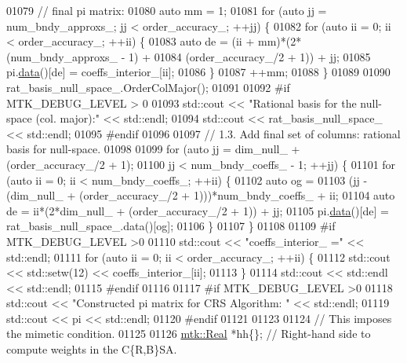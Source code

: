 \begin{DoxyCode}
{{01079   \textcolor{comment}{// final pi matrix:}
01080   \textcolor{keyword}{auto} mm = 1;
01081   \textcolor{keywordflow}{for} (\textcolor{keyword}{auto} jj = num\_bndy\_approxs\_; jj < order\_accuracy\_; ++jj) \{
01082     \textcolor{keywordflow}{for} (\textcolor{keyword}{auto} ii = 0; ii < order\_accuracy\_; ++ii) \{
01083       \textcolor{keyword}{auto} de = (ii + mm)*(2*(num\_bndy\_approxs\_ - 1) +
01084         (order\_accuracy\_/2 + 1)) + jj;
01085       pi.\hyperlink{classmtk_1_1DenseMatrix_a16b3ff56feb2658b9fc7147d1de4d8e7}{data}()[de] = coeffs\_interior\_[ii];
01086     \}
01087     ++mm;
01088   \}
01089 
01090   rat\_basis\_null\_space\_.OrderColMajor();
01091 
01092 \textcolor{preprocessor}{  #if MTK\_DEBUG\_LEVEL > 0}
01093   std::cout << \textcolor{stringliteral}{"Rational basis for the null-space (col. major):"} << std::endl;
01094   std::cout << rat\_basis\_null\_space\_ << std::endl;
01095 \textcolor{preprocessor}{  #endif}
01096 
01097   \textcolor{comment}{// 1.3. Add final set of columns: rational basis for null-space.}
01098 
01099   \textcolor{keywordflow}{for} (\textcolor{keyword}{auto} jj = dim\_null\_ + (order\_accuracy\_/2 + 1);
01100        jj < num\_bndy\_coeffs\_ - 1; ++jj) \{
01101     \textcolor{keywordflow}{for} (\textcolor{keyword}{auto} ii = 0; ii < num\_bndy\_coeffs\_; ++ii) \{
01102       \textcolor{keyword}{auto} og =
01103         (jj - (dim\_null\_ + (order\_accuracy\_/2 + 1)))*num\_bndy\_coeffs\_ + ii;
01104       \textcolor{keyword}{auto} de = ii*(2*dim\_null\_ + (order\_accuracy\_/2 + 1)) + jj;
01105       pi.\hyperlink{classmtk_1_1DenseMatrix_a16b3ff56feb2658b9fc7147d1de4d8e7}{data}()[de] = rat\_basis\_null\_space\_.data()[og];
01106     \}
01107   \}
01108 
01109 \textcolor{preprocessor}{  #if MTK\_DEBUG\_LEVEL >0}
01110   std::cout << \textcolor{stringliteral}{"coeffs\_interior\_ ="} << std::endl;
01111   \textcolor{keywordflow}{for} (\textcolor{keyword}{auto} ii = 0; ii < order\_accuracy\_; ++ii) \{
01112     std::cout << std::setw(12) << coeffs\_interior\_[ii];
01113   \}
01114   std::cout << std::endl << std::endl;
01115 \textcolor{preprocessor}{  #endif}
01116 
01117 \textcolor{preprocessor}{  #if MTK\_DEBUG\_LEVEL >0}
01118   std::cout << \textcolor{stringliteral}{"Constructed pi matrix for CRS Algorithm: "} << std::endl;
01119   std::cout << pi << std::endl;
01120 \textcolor{preprocessor}{  #endif}
01121 
01123 
01124   \textcolor{comment}{// This imposes the mimetic condition.}
01125 
01126   \hyperlink{group__c01-roots_gac080bbbf5cbb5502c9f00405f894857d}{mtk::Real} *hh\{\};  \textcolor{comment}{// Right-hand side to compute weights in the C\{R,B\}SA.}
}}
\end{DoxyCode}
